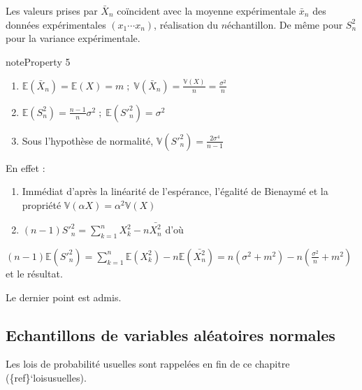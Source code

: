 \documentclass[letterpaper,10pt,english]{jupyterBook}
\begin{document}
\sphinxAtStartPar
Les valeurs prises par \(\bar{X}_n\) coïncident avec la moyenne expérimentale \(\bar{x}_n\) des données expérimentales \((x_1\cdots x_n)\), réalisation du \(n\)\sphinxhyphen{}échantillon. De même pour \(S_n^2\) pour la variance expérimentale.
\label{elemstats:property-2}
\begin{sphinxadmonition}{note}{Property 5}


\begin{enumerate}
%
\item {} 
\sphinxAtStartPar
\(\mathbb{E}(\bar{X}_n)= \mathbb{E}(X)=m\; ;\; \mathbb{V}(\bar{X}_n) = \frac{\mathbb{V}(X)}{n}=\frac{\sigma^2}{n}\)

\item {} 
\sphinxAtStartPar
\(\mathbb{E}(S_n^2) = \frac{n-1}{n}\sigma^2\; ;\;  \mathbb{E}({S'}_n^2)=\sigma^2\)

\item {} 
\sphinxAtStartPar
Sous l’hypothèse de normalité, \(\mathbb{V}({S'}_n^2)=\frac{2\sigma^4}{n-1}\)

\end{enumerate}
\end{sphinxadmonition}

\sphinxAtStartPar
En effet :
\begin{enumerate}
%
\item {} 
\sphinxAtStartPar
Immédiat d’après la linéarité de l’espérance, l’égalité de Bienaymé et la propriété \(\mathbb{V}(\alpha X)=\alpha^2\mathbb{V}(X)\)

\item {} 
\sphinxAtStartPar
\((n-1){S'}_n^2=\displaystyle\sum_{k=1}^n X_k^2-n\bar{X_n^2}\) d’où

\end{enumerate}

\sphinxAtStartPar
\((n-1)\mathbb{E}({S'}_n^2)=\displaystyle\sum_{k=1}^n\mathbb{E}(X_k^2)-n\mathbb{E}(\bar{X_n^2})=n(\sigma^2+m^2)-n\left (\frac{\sigma^2}{n}+m^2 \right )\)
et le résultat.

\sphinxAtStartPar
Le dernier point est admis.


\subsection{Echantillons de variables aléatoires normales}
\label{\detokenize{elemstats:echantillons-de-variables-aleatoires-normales}}
\sphinxAtStartPar
Les lois de probabilité usuelles sont rappelées en fin de ce chapitre (\{ref\}`loisusuelles).
\end{document}
